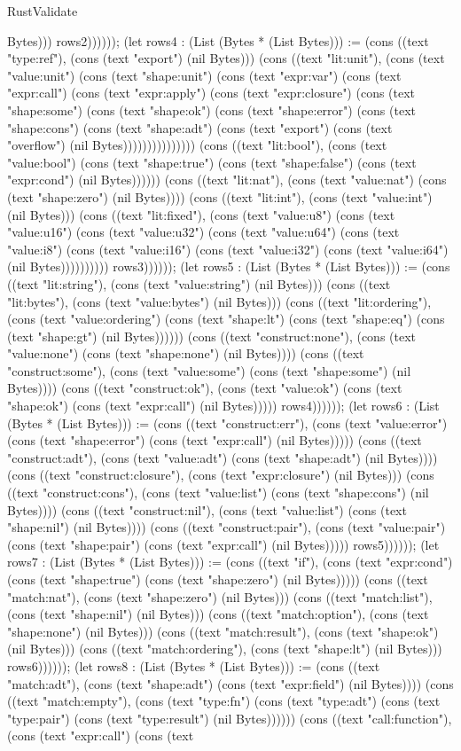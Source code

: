 \begin{lexlean}{RustValidate}
\begin{semanticmodule}
{Bytes))) rows2)))))); (let rows4 : (List (Bytes * (List Bytes))) := (cons ((text "type:ref"), (cons (text "export") (nil Bytes))) (cons ((text "lit:unit"), (cons (text "value:unit") (cons (text "shape:unit") (cons (text "expr:var") (cons (text "expr:call") (cons (text "expr:apply") (cons (text "expr:closure") (cons (text "shape:some") (cons (text "shape:ok") (cons (text "shape:error") (cons (text "shape:cons") (cons (text "shape:adt") (cons (text "export") (cons (text "overflow") (nil Bytes))))))))))))))) (cons ((text "lit:bool"), (cons (text "value:bool") (cons (text "shape:true") (cons (text "shape:false") (cons (text "expr:cond") (nil Bytes)))))) (cons ((text "lit:nat"), (cons (text "value:nat") (cons (text "shape:zero") (nil Bytes)))) (cons ((text "lit:int"), (cons (text "value:int") (nil Bytes))) (cons ((text "lit:fixed"), (cons (text "value:u8") (cons (text "value:u16") (cons (text "value:u32") (cons (text "value:u64") (cons (text "value:i8") (cons (text "value:i16") (cons (text "value:i32") (cons (text "value:i64") (nil Bytes)))))))))) rows3)))))); (let rows5 : (List (Bytes * (List Bytes))) := (cons ((text "lit:string"), (cons (text "value:string") (nil Bytes))) (cons ((text "lit:bytes"), (cons (text "value:bytes") (nil Bytes))) (cons ((text "lit:ordering"), (cons (text "value:ordering") (cons (text "shape:lt") (cons (text "shape:eq") (cons (text "shape:gt") (nil Bytes)))))) (cons ((text "construct:none"), (cons (text "value:none") (cons (text "shape:none") (nil Bytes)))) (cons ((text "construct:some"), (cons (text "value:some") (cons (text "shape:some") (nil Bytes)))) (cons ((text "construct:ok"), (cons (text "value:ok") (cons (text "shape:ok") (cons (text "expr:call") (nil Bytes))))) rows4)))))); (let rows6 : (List (Bytes * (List Bytes))) := (cons ((text "construct:err"), (cons (text "value:error") (cons (text "shape:error") (cons (text "expr:call") (nil Bytes))))) (cons ((text "construct:adt"), (cons (text "value:adt") (cons (text "shape:adt") (nil Bytes)))) (cons ((text "construct:closure"), (cons (text "expr:closure") (nil Bytes))) (cons ((text "construct:cons"), (cons (text "value:list") (cons (text "shape:cons") (nil Bytes)))) (cons ((text "construct:nil"), (cons (text "value:list") (cons (text "shape:nil") (nil Bytes)))) (cons ((text "construct:pair"), (cons (text "value:pair") (cons (text "shape:pair") (cons (text "expr:call") (nil Bytes))))) rows5)))))); (let rows7 : (List (Bytes * (List Bytes))) := (cons ((text "if"), (cons (text "expr:cond") (cons (text "shape:true") (cons (text "shape:zero") (nil Bytes))))) (cons ((text "match:nat"), (cons (text "shape:zero") (nil Bytes))) (cons ((text "match:list"), (cons (text "shape:nil") (nil Bytes))) (cons ((text "match:option"), (cons (text "shape:none") (nil Bytes))) (cons ((text "match:result"), (cons (text "shape:ok") (nil Bytes))) (cons ((text "match:ordering"), (cons (text "shape:lt") (nil Bytes))) rows6)))))); (let rows8 : (List (Bytes * (List Bytes))) := (cons ((text "match:adt"), (cons (text "shape:adt") (cons (text "expr:field") (nil Bytes)))) (cons ((text "match:empty"), (cons (text "type:fn") (cons (text "type:adt") (cons (text "type:pair") (cons (text "type:result") (nil Bytes)))))) (cons ((text "call:function"), (cons (text "expr:call") (cons (text }
\end{semanticmodule}
\end{lexlean}
